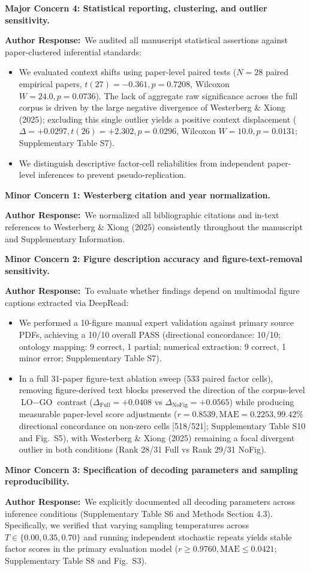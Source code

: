 \documentclass[11pt]{article}
\newcommand{\reviewercomment}[1]{\vspace{1em}\noindent\textbf{\color{blue!80!black}#1}\vspace{0.4em}}
\newcommand{\authorsresponse}{\noindent\textbf{\color{black}Author Response:}\ }
\begin{document}
\reviewercomment{Major Concern 4: Statistical reporting, clustering, and outlier sensitivity.}

\authorsresponse We audited all manuscript statistical assertions against paper-clustered inferential standards:
\begin{itemize}[leftmargin=*,noitemsep]
\item We evaluated context shifts using paper-level paired tests ($N=28$ paired empirical papers, $t(27) = -0.361, p = 0.7208$, Wilcoxon $W = 24.0, p = 0.0736$). The lack of aggregate raw significance across the full corpus is driven by the large negative divergence of Westerberg \& Xiong (2025); excluding this single outlier yields a positive context displacement ($\Delta = +0.0297, t(26) = +2.302, p = 0.0296$, Wilcoxon $W = 10.0, p = 0.0131$; Supplementary Table S7).
\item We distinguish descriptive factor-cell reliabilities from independent paper-level inferences to prevent pseudo-replication.
\end{itemize}

\reviewercomment{Minor Concern 1: Westerberg citation and year normalization.}

\authorsresponse We normalized all bibliographic citations and in-text references to Westerberg \& Xiong (2025) consistently throughout the manuscript and Supplementary Information.

\reviewercomment{Minor Concern 2: Figure description accuracy and figure-text-removal sensitivity.}

\authorsresponse To evaluate whether findings depend on multimodal figure captions extracted via DeepRead:
\begin{itemize}[leftmargin=*,noitemsep]
\item We performed a 10-figure manual expert validation against primary source PDFs, achieving a 10/10 overall PASS (directional concordance: 10/10; ontology mapping: 9 correct, 1 partial; numerical extraction: 9 correct, 1 minor error; Supplementary Table S7).
\item In a full 31-paper figure-text ablation sweep (533 paired factor cells), removing figure-derived text blocks preserved the direction of the corpus-level $\text{LO}-\text{GO}$ contrast ($\Delta_{\text{Full}} = +0.0408$ vs $\Delta_{\text{NoFig}} = +0.0565$) while producing measurable paper-level score adjustments ($r = 0.8539, \text{MAE} = 0.2253, 99.42\%$ directional concordance on non-zero cells [518/521]; Supplementary Table S10 and Fig.~S5), with Westerberg \& Xiong (2025) remaining a focal divergent outlier in both conditions (Rank 28/31 Full vs Rank 29/31 NoFig).
\end{itemize}

\reviewercomment{Minor Concern 3: Specification of decoding parameters and sampling reproducibility.}

\authorsresponse We explicitly documented all decoding parameters across inference conditions (Supplementary Table S6 and Methods Section 4.3). Specifically, we verified that varying sampling temperatures across $T \in \{0.00, 0.35, 0.70\}$ and running independent stochastic repeats yields stable factor scores in the primary evaluation model ($r \ge 0.9760, \text{MAE} \le 0.0421$; Supplementary Table S8 and Fig.~S3).
\end{document}

